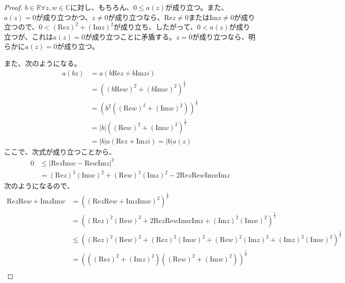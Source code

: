 \documentclass[dvipdfmx]{jsarticle}
\begin{document}
\begin{proof}
$b \in \mathbb{R}\forall z,w \in \mathbb{C}$に対し、もちろん、$0 \leq a(z)$が成り立つ。また、$a(z) = 0$が成り立つかつ、$z \neq 0$が成り立つなら、$\mathrm{Re}z \neq 0$または$\mathrm{Im}z \neq 0$が成り立つので、$0 < \left( \mathrm{Re}z \right)^{2} + \left( \mathrm{Im}z \right)^{2}$が成り立ち、したがって、$0 < a(z)$が成り立つが、これは$a(z) = 0$が成り立つことに矛盾する。$z = 0$が成り立つなら、明らかに$a(z) = 0$が成り立つ。\par
また、次のようになる。
\begin{align*}
a(bz) &= a\left( b\mathrm{Re}z + b\mathrm{Im}zi \right)\\
&= \left( \left( b\mathrm{Re}w \right)^{2} + \left( b\mathrm{Im}w \right)^{2} \right)^{\frac{1}{2}}\\
&= \left( b^{2}\left( \left( \mathrm{Re}w \right)^{2} + \left( \mathrm{Im}w \right)^{2} \right) \right)^{\frac{1}{2}}\\
&= |b|\left( \left( \mathrm{Re}w \right)^{2} + \left( \mathrm{Im}w \right)^{2} \right)^{\frac{1}{2}}\\
&= |b|a\left( \mathrm{Re}z + \mathrm{Im}zi \right) = |b|a(z)
\end{align*}
ここで、次式が成り立つことから、
\begin{align*}
0 &\leq \left| \mathrm{Re}z\mathrm{Im}w - \mathrm{Re}w\mathrm{Im}z \right|^{2}\\
&= \left( \mathrm{Re}z \right)^{2}\left( \mathrm{Im}w \right)^{2} + \left( \mathrm{Re}w \right)^{2}\left( \mathrm{Im}z \right)^{2} - 2\mathrm{Re}z\mathrm{Re}w\mathrm{Im}w\mathrm{Im}z
\end{align*}
次のようになるので、
\begin{align*}
\mathrm{Re}z\mathrm{Re}w + \mathrm{Im}z\mathrm{Im}w &= \left( \left( \mathrm{Re}z\mathrm{Re}w + \mathrm{Im}z\mathrm{Im}w \right)^{2} \right)^{\frac{1}{2}}\\
&= \left( \left( \mathrm{Re}z \right)^{2}\left( \mathrm{Re}w \right)^{2} + 2\mathrm{Re}z\mathrm{Re}w\mathrm{Im}w\mathrm{Im}z + \left( \mathrm{Im}z \right)^{2}\left( \mathrm{Im}w \right)^{2} \right)^{\frac{1}{2}}\\
&\leq \left( \left( \mathrm{Re}z \right)^{2}\left( \mathrm{Re}w \right)^{2} + \left( \mathrm{Re}z \right)^{2}\left( \mathrm{Im}w \right)^{2} + \left( \mathrm{Re}w \right)^{2}\left( \mathrm{Im}z \right)^{2} + \left( \mathrm{Im}z \right)^{2}\left( \mathrm{Im}w \right)^{2} \right)^{\frac{1}{2}}\\
&= \left( \left( \left( \mathrm{Re}z \right)^{2} + \left( \mathrm{Im}z \right)^{2} \right)\left( \left( \mathrm{Re}w \right)^{2} + \left( \mathrm{Im}w \right)^{2} \right) \right)^{\frac{1}{2}}\\

\end{align*}
\end{proof}
\end{document}
